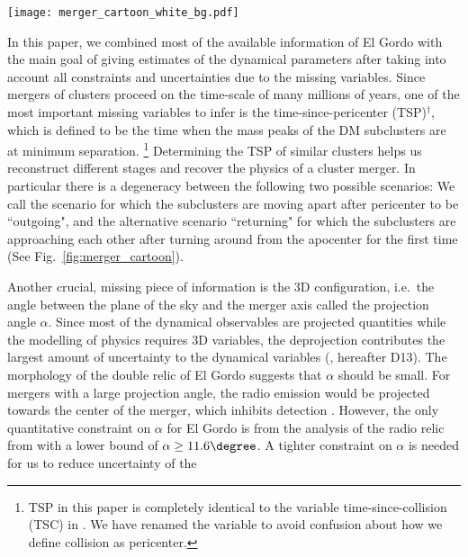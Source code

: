 \begin{figure*}
	\texttt{[image: merger\_cartoon\_white\_bg.pdf]}
	\caption{Illustration of the spatial location of different components of El Gordo at
		different stages of the merger. Earlier stages (with a smaller TSP) are on the left side of later stages. The rightmost returning scenario is preferred from our simulation.} 
	\label{fig:merger_cartoon}
\end{figure*}
In this paper, we combined most of the available information of El Gordo
with the main goal of giving estimates of
the dynamical parameters after taking into account all
constraints and uncertainties due to the missing variables.
Since mergers of clusters proceed on the time-scale of many millions of
years, one of the most important missing variables to infer is the
time-since-pericenter (TSP)$^\dagger$, which is defined to be the time when the mass
peaks of the DM subclusters are at minimum separation. \footnote{TSP in this
	paper is completely identical to the variable time-since-collision (TSC) in
	\cite{Dawson12}. We have renamed the variable to avoid confusion about how we
define collision as pericenter.}
Determining the TSP of similar clusters helps
us reconstruct different stages and recover the physics of a cluster merger.
In particular there is a degeneracy between the following two possible
scenarios:
We call the scenario for which the subclusters are
moving apart after pericenter to be ``outgoing", and the alternative scenario 
``returning" for which the subclusters are approaching each other after turning
around from the apocenter for the first time (See
Fig.~\ref{fig:merger_cartoon}).\par
Another crucial, missing piece of information is the 3D
configuration, i.e.\ the angle between the plane of the sky and the merger
axis called the projection angle $\alpha$. Since most of the dynamical
observables are projected quantities while the modelling of physics
requires 3D
variables, the deprojection contributes the
largest amount of uncertainty to the dynamical variables
(\citealt{D13}, hereafter D13). The morphology of the double relic of El Gordo suggests that
$\alpha$ should be small. 
For mergers with a
large projection angle, the radio emission would be projected towards the
center of the merger, which inhibits detection \citep{Vazza11}.
However, the only quantitative constraint on $\alpha$ for El Gordo is from
the analysis of the radio relic from \cite{L13} with a lower bound of $\alpha \geq 11.6 \degree$. A tighter
constraint on $\alpha$ is needed for us to reduce uncertainty of the
